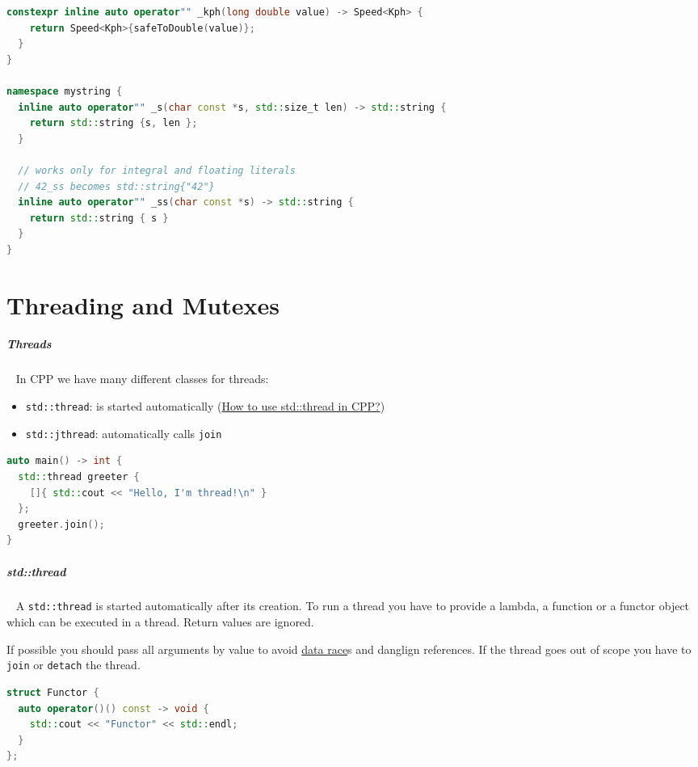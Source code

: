 \documentclass[11pt,twoside,landscape]{article}
\begin{document}
\begin{multicols}{2}
\begin{lstlisting}[language=c++,label=lst:user-defined-literal-for-speed,caption={user-defined literal for Speed},captionpos=b,numbers=none]
  constexpr inline auto operator"" _kph(long double value) -> Speed<Kph> {
    return Speed<Kph>{safeToDouble(value)};
  }
}

namespace mystring {
  inline auto operator"" _s(char const *s, std::size_t len) -> std::string {
    return std::string {s, len };
  }

  // works only for integral and floating literals
  // 42_ss becomes std::string{"42"}
  inline auto operator"" _ss(char const *s) -> std::string {
    return std::string { s }
  }
}
\end{lstlisting}

\section{Threading and Mutexes}
\label{sec:orgb394cfe}
\subparagraph{Threads} \
\label{sec:org58b203b}
In CPP we have many different classes for threads:
\begin{itemize}
\item \texttt{std::thread}: is started automatically (\href{../../../roam/20230629112109-how_to_use_std_thread_in_cpp.org}{How to use std::thread in CPP?})
\item \texttt{std::jthread}: automatically calls \texttt{join}
\end{itemize}



\begin{lstlisting}[language=c++,label=lst:threads-in-cpp,caption={threads in CPP},captionpos=b,numbers=none]
auto main() -> int {
  std::thread greeter {
    []{ std::cout << "Hello, I'm thread!\n" }
  };
  greeter.join();
}
\end{lstlisting}

\subparagraph{std::thread} \
\label{sec:org1cbfc29}
A \texttt{std::thread} is started automatically after its creation.
To run a thread you have to provide a lambda, a function or a functor object which can be executed in a thread.
Return values are ignored.

If possible you should pass all arguments by value to avoid \href{../../../roam/20220323174221-what_is_a_data_race.org}{data race}s and danglign references.
If the thread goes out of scope you have to \texttt{join} or \texttt{detach} the thread.

\begin{lstlisting}[language=c++,caption={std::thread example},captionpos=b,numbers=none]
struct Functor {
  auto operator()() const -> void {
    std::cout << "Functor" << std::endl;
  }
};


\end{lstlisting}
\end{multicols}
\end{document}
